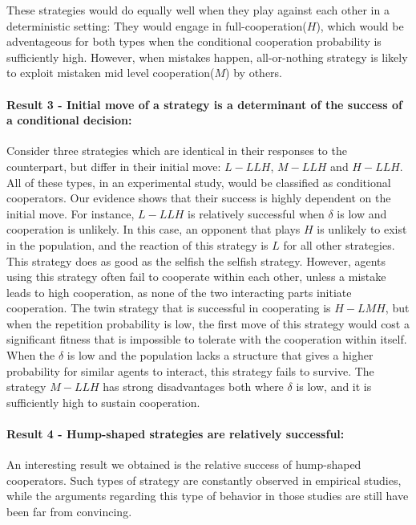 \documentclass[12pt]{article}
\begin{document}
These strategies would do equally well when they play against each other in a deterministic setting: They would engage in full-cooperation($H$), which would be adventageous for both types when the conditional cooperation probability is sufficiently high.  However, when mistakes happen, all-or-nothing strategy is likely to exploit mistaken mid level cooperation($M$) by others.

\paragraph{Result 3 - Initial move of a strategy is a determinant of the success of a conditional decision:}
Consider three strategies which are identical in their responses to the counterpart, but differ in their initial move: $L-LLH$, $M-LLH$ and $H-LLH$.  All of these types, in an experimental study, would be classified as conditional cooperators. Our evidence shows that their success is highly dependent on the initial move. For instance, $L-LLH$ is relatively successful when $\delta$ is low and cooperation is unlikely. In this case, an opponent that plays $H$ is unlikely to exist in the population, and the reaction of this strategy is $L$ for all other strategies. This strategy does as good as the selfish the selfish strategy. However, agents using this strategy often fail to cooperate within each other, unless a mistake leads to high cooperation, as none of the two interacting parts initiate cooperation. The twin strategy that is successful in cooperating is $H-LMH$, but when the repetition probability is low, the first move of this strategy would cost a significant fitness that is impossible to tolerate with the cooperation within itself. When the $\delta$ is low and the  population lacks a structure that gives a higher probability for similar agents to interact, this strategy fails to survive. The strategy $M-LLH$  has strong disadvantages both where $\delta$ is low, and it is sufficiently high to sustain cooperation. 


\paragraph{Result 4 - Hump-shaped strategies are relatively successful:}
An interesting result we obtained is the relative success of hump-shaped cooperators. Such types of strategy are constantly observed in empirical studies, while the arguments regarding this type of behavior in those studies are still have been far from convincing. 
\end{document}
